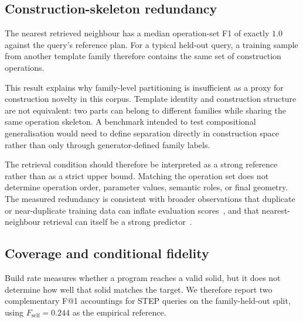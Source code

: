 \documentclass[preprint,12pt]{elsarticle}
\begin{document}
\subsection{Construction-skeleton redundancy}
\label{app:skeleton}

The nearest retrieved neighbour has a median operation-set F1 of exactly $1.0$ against the query's reference plan. For a typical held-out query, a training sample from another template family therefore contains the same set of construction operations.

This result explains why family-level partitioning is insufficient as a proxy for construction novelty in this corpus. Template identity and construction structure are not equivalent: two parts can belong to different families while sharing the same operation skeleton. A benchmark intended to test compositional generalisation would need to define separation directly in construction space rather than only through generator-defined family labels.

The retrieval condition should therefore be interpreted as a strong reference rather than as a strict upper bound. Matching the operation set does not determine operation order, parameter values, semantic roles, or final geometry. The measured redundancy is consistent with broader observations that duplicate or near-duplicate training data can inflate evaluation scores~\cite{lee2022dedup}, and that nearest-neighbour retrieval can itself be a strong predictor~\cite{khandelwal2020knnlm}.

\subsection{Coverage and conditional fidelity}
\label{app:accountings}

Build rate measures whether a program reaches a valid solid, but it does not determine how well that solid matches the target. We therefore report two complementary F@1 accountings for STEP queries on the family-held-out split, using $F_{\mathrm{self}}=0.244$ as the empirical reference.
\end{document}
